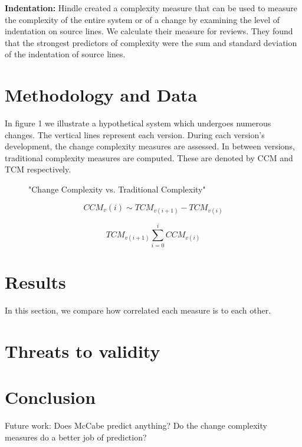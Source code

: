 \documentclass[8pt,twocolumn,a4paper]{article}
\begin{document}
{\bf Indentation:} Hindle \cite{Hindle2008ICPC} created a complexity
measure that can be used to measure the complexity of the entire system or of a
change by examining the level of indentation on source lines. We calculate
their measure for reviews. They found that the strongest predictors of
complexity were the sum and standard deviation of the indentation of source
lines. 


\section{Methodology and Data}


In figure 1 we illustrate a hypothetical system which undergoes numerous changes. The vertical lines represent each version. During each version's development, the change complexity measures are assessed. In between versions, traditional complexity measures are computed. These are denoted by CCM and TCM respectively.

\begin{figure}[h!]
  \centering
   \caption{"Change Complexity vs. Traditional Complexity"}
\end{figure}

\begin{equation}
{{CCM_{v}(i)} \sim {TCM_{v(i+1)}}-{TCM_{v(i)}}}
\end{equation}

\begin{equation}
{{TCM_{v(i+1)}} \sum\limits_{i=0}^iCCM_{v(i)}}
\end{equation}
 


\section{Results}

In this section, we compare how correlated each measure is to each other.

\section{Threats to validity}

\section{Conclusion}

Future work: Does McCabe predict anything? Do the change complexity measures do a better job of prediction?
\end{document}
